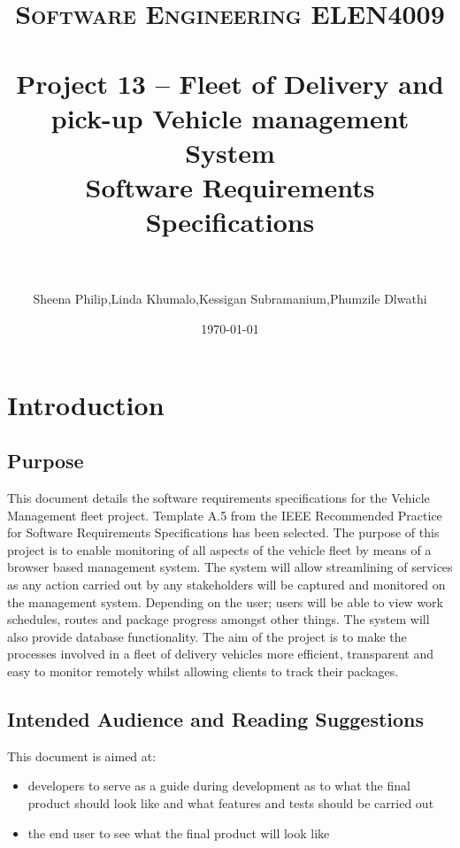 \documentclass[paper=a4, fontsize=11pt]{scrartcl} %
\title{	
\normalfont \normalsize 
\textsc{Software Engineering ELEN4009} \\ [25pt] %
\horrule{0.5pt} \\[0.4cm] %
\huge Project 13 -- Fleet of Delivery and pick-up Vehicle management System \\ %
\huge Software Requirements Specifications \\ %
\horrule{2pt} \\[0.5cm] %
}
\author{Sheena Philip,Linda Khumalo,Kessigan Subramanium,Phumzile Dlwathi} %
\date{\normalsize\today} %
\numberwithin{equation}{section} %
\numberwithin{figure}{section} %
\numberwithin{table}{section} %
\begin{document}
\maketitle %


\section{Introduction}

\subsection{Purpose}

This document details the software requirements specifications for the Vehicle Management fleet project. Template A.5 from the IEEE Recommended Practice for Software Requirements Specifications has been selected. 
The purpose of this project is to enable monitoring of all aspects of the vehicle fleet by means of a  browser based management system. The system will allow streamlining of services as any action carried out by any stakeholders will be captured and monitored on the management system. Depending on the user; users will be able to view work schedules, routes and package progress amongst other things. The system will also provide database functionality. The aim of the project is to make the processes involved in a fleet of delivery vehicles more efficient, transparent and easy to monitor remotely whilst allowing clients to track their packages. 

\subsection{Intended Audience and Reading Suggestions}
This document is aimed at:

\begin{itemize}
	\item developers to serve as a guide during development as to what the final product should look like and what features and tests should be carried out

		\item the end user to see what the final product will look like
	
	 
\end{itemize}
\end{document}
